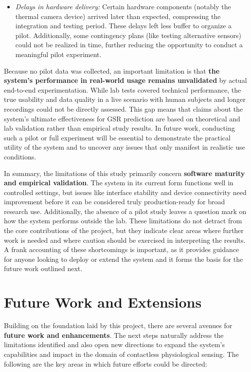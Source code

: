 \begin{itemize}
\item \textit{Delays in hardware delivery:} Certain hardware components (notably
  the thermal camera device) arrived later than expected, compressing
  the integration and testing period. These delays left less buffer to
  organize a pilot. Additionally, some contingency plans (like testing
  alternative sensors) could not be realized in time, further reducing
  the opportunity to conduct a meaningful pilot experiment.

\end{itemize}
Because no pilot data was collected, an important limitation is that
\textbf{the system's performance in real-world usage remains unvalidated} by
actual end-to-end experimentation. While lab tests covered technical
performance, the true usability and data quality in a live scenario with
human subjects and longer recordings could not be directly assessed.
This gap means that claims about the system's ultimate effectiveness for
GSR prediction are based on theoretical and lab validation rather than
empirical study results. In future work, conducting such a pilot or full
experiment will be essential to demonstrate the practical utility of the
system and to uncover any issues that only manifest in realistic use
conditions.

In summary, the limitations of this study primarily concern \textbf{software
maturity and empirical validation}. The system in its current form
functions well in controlled settings, but issues like interface
stability and device connectivity need improvement before it can be
considered truly production-ready for broad research use. Additionally,
the absence of a pilot study leaves a question mark on how the system
performs outside the lab. These limitations do not detract from the core
contributions of the project, but they indicate clear areas where
further work is needed and where caution should be exercised in
interpreting the results. A frank accounting of these shortcomings is
important, as it provides guidance for anyone looking to deploy or
extend the system and it forms the basis for the future work outlined
next.

\section{Future Work and Extensions}

Building on the foundation laid by this project, there are several
avenues for \textbf{future work and enhancements}. The next steps naturally
address the limitations identified and also open new directions to
expand the system's capabilities and impact in the domain of contactless
physiological sensing. The following are the key areas in which future
efforts could be directed:

